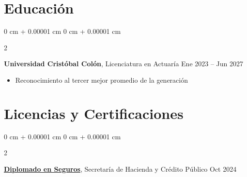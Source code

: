 \documentclass[10pt, letterpaper]{article}
\newenvironment{highlights}{
    \begin{itemize}[
        topsep=0.10 cm,
        parsep=0.10 cm,
        partopsep=0pt,
        itemsep=0pt,
        leftmargin=0 cm + 10pt
    ]
}{
    \end{itemize}
} %
\newenvironment{onecolentry}{
    \begin{adjustwidth}{
        0 cm + 0.00001 cm
    }{
        0 cm + 0.00001 cm
    }
}{
    \end{adjustwidth}
} %
\newenvironment{twocolentry}[2][]{
    \onecolentry
    \def\secondColumn{#2}
    \setcolumnwidth{\fill, 4.5 cm}
    \begin{paracol}{2}
}{
    \switchcolumn \raggedleft \secondColumn
    \end{paracol}
    \endonecolentry
} %
\begin{document}
        


    
    \section{Educación}
        
        \begin{twocolentry}{
            Ene 2023 – Jun 2027
        }
            \textbf{Universidad Cristóbal Colón}, Licenciatura en Actuaría\end{twocolentry}
                \begin{highlights}
                    \item Reconocimiento al tercer mejor promedio de la generación
                \end{highlights}    
        \vspace{0.10 cm}

 \section{Licencias y Certificaciones}

        \begin{twocolentry}{
            Oct 2024
        }
            \href{https://diplomadoenseguros.condusef.gob.mx/qr_verifica.php?ida=21647&idg=3}{\textbf{Diplomado en Seguros}}, Secretaría de Hacienda y Crédito Público\end{twocolentry}
\end{document}
